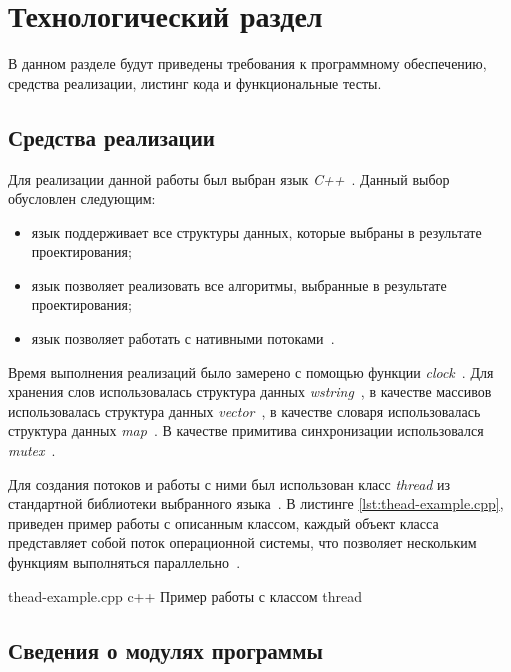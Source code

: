 \chapter{Технологический раздел}

В данном разделе будут приведены требования к программному обеспечению, средства реализации, листинг кода и функциональные тесты.


\section{Средства реализации}

Для реализации данной работы был выбран язык \textit{C++}~\cite{cpp}.
Данный выбор обусловлен следующим:
\begin{itemize}
	\item язык поддерживает все структуры данных, которые выбраны в результате проектирования;
	\item язык позволяет реализовать все алгоритмы, выбранные в результате проектирования;
	\item язык позволяет работать с нативными потоками~\cite{thread}. 
\end{itemize}

Время выполнения реализаций было замерено с помощью функции \textit{clock}~\cite{clock}. 
Для хранения слов использовалась структура данных \textit{wstring}~\cite{wstring}, в качестве массивов использовалась структура данных \textit{vector}~\cite{vector}, в качестве словаря использовалась структура данных \textit{map}~\cite{map}.
В качестве примитива синхронизации использовался \textit{mutex}~\cite{mutex}.

Для создания потоков и работы с ними был использован класс \textit{thread} из стандартной библиотеки выбранного языка~\cite{thread}.
В листинге \ref{lst:thead-example.cpp}, приведен пример работы с описанным классом, каждый объект класса представляет собой поток операционной системы, что позволяет нескольким функциям выполняться параллельно~\cite{thread}. 

\clearpage
{}
{thead-example.cpp} %
{c++} %
{Пример работы с классом thread} %



\section{Сведения о модулях программы}

